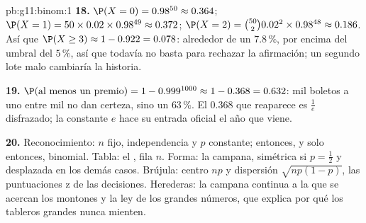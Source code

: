 \begin{solution}{pb:g11:binom:1}
\textbf{18.} $\P(X = 0) = 0.98^{50} \approx 0.364$;
$\P(X = 1) = 50 \times 0.02 \times 0.98^{49} \approx 0.372$;
$\P(X = 2) = \binom{50}{2} 0.02^2 \times 0.98^{48} \approx 0.186$. Así
que $\P(X \geq 3) \approx 1 - 0.922 = 0.078$: alrededor de un
$7.8\,\%$, por encima del umbral del $5\,\%$, así que todavía no basta
para rechazar la afirmación; un segundo lote malo cambiaría la historia.

\textbf{19.} $\P(\text{al menos un premio}) = 1 - 0.999^{1000} \approx
1 - 0.368 = 0.632$: mil boletos a uno entre mil no dan certeza, sino un
$63\,\%$. El $0.368$ que reaparece es $\frac1e$ disfrazado; la constante
$e$ hace su entrada oficial el año que viene.

\textbf{20.} Reconocimiento: $n$ fijo, independencia y $p$ constante;
entonces, y solo entonces, binomial. Tabla: el , fila
$n$. Forma: la campana, simétrica si $p = \frac12$ y desplazada en los
demás casos. Brújula: centro $np$ y dispersión $\sqrt{np(1-p)}$, las
puntuaciones z de las decisiones. Herederas: la campana continua a la que
se acercan los montones y la ley de los grandes números, que explica por
qué los tableros grandes nunca mienten.
\end{solution}
